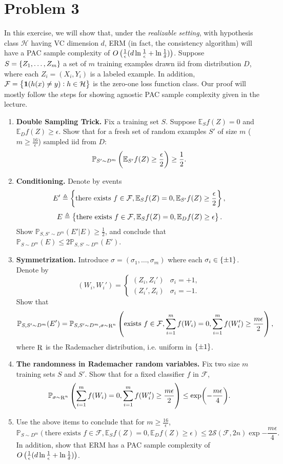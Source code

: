 \documentclass{article}
\DeclareMathOperator*{\R}{{\rm R}}
\newcommand{\EE}{\mathbb{E}} %
\newcommand{\PP}{\mathbb{P}} %
\newcommand{\Hcal}{\mathcal{H}} %
\newcommand{\Fcal}{\mathcal{F}} %
\newcommand{\Scal}{\mathcal{S}} %
\newcommand{\defeq}{\triangleq}
\newcommand*{\one}{{\bf 1}}
\begin{document}
\section*{Problem 3}
In this exercise, we will show that, under the {\em realizable setting}, with hypothesis class $\Hcal$ having VC dimension $d$, ERM (in fact, the consistency algorithm) will have a PAC sample complexity of $O\del{\frac1\epsilon(d \ln\frac1\epsilon + \ln\frac1\delta)}$. Suppose $S = \cbr{Z_1,\ldots,Z_m}$ a set of $m$ training examples drawn iid from distribution $D$,
where each $Z_i = (X_i, Y_i)$ is a labeled example. In addition, $\Fcal = \cbr{\one(h(x) \neq y): h \in \Hcal}$ is the zero-one loss function class. Our proof will mostly follow the steps for showing agnostic PAC sample complexity given in the lecture.

\begin{enumerate}
\item \textbf{Double Sampling Trick.} Fix a training set $S$. Suppose $\EE_S f(Z) = 0$ and $\EE_D f(Z) \geq \epsilon$. Show that for a fresh set of random examples $S'$ of size $m$ ($m \geq \frac{16}{\epsilon}$) sampled iid from $D$:
\[ \PP_{S' \sim D^m}\del{ \EE_{S'} f(Z) \geq \frac \epsilon 2} \geq \frac 1 2. \]

\item \textbf{Conditioning.} Denote by events
\[ E' \defeq \cbr{\text{there exists } f \in \Fcal, \EE_S f(Z) = 0, \EE_{S'} f(Z) \geq \frac \epsilon 2}, \]
\[ E \defeq \cbr{\text{there exists } f \in \Fcal, \EE_S f(Z) = 0, \EE_D f(Z) \geq \epsilon}. \]
Show $\PP_{S, S' \sim D^m}(E'|E) \geq \frac 12$, and conclude that $\PP_{S \sim D^m}(E) \leq 2\PP_{S, S' \sim D^m}(E')$.

\item \textbf{Symmetrization.} Introduce $\sigma = (\sigma_1,\ldots,\sigma_m)$ where each $\sigma_i \in \cbr{\pm 1}$. Denote by
\[
  (W_i, W_i') = \begin{cases} (Z_i, Z_i') & \sigma_i = +1, \\ (Z_i', Z_i) & \sigma_i = -1. \end{cases}
\]
Show that
\[ \PP_{S, S' \sim D^m}(E') = \PP_{S, S' \sim D^m, \sigma \sim \R^n}\del{\text{exists } f \in \Fcal, \sum_{i=1}^m f(W_i) = 0, \sum_{i=1}^m f(W_i') \geq \frac{m\epsilon}{2}}, \]
where $\R$ is the Rademacher distribution, i.e. uniform in $\cbr{\pm 1}$.

\item \textbf{The randomness in Rademacher random variables.} Fix two size $m$ training sets $S$ and $S'$. Show that for a fixed classifier
$f$ in $\Fcal$,
\[ \PP_{\sigma \sim \R^n} \del{ \sum_{i=1}^m f(W_i) = 0, \sum_{i=1}^m f(W_i') \geq \frac{m\epsilon}{2} } \leq \exp(-\frac{m\epsilon}{4}).  \]

\item Use the above items to conclude that for $m \geq \frac{16}{\epsilon}$,
\[ \PP_{S \sim D^m}(\text{there exists } f \in \Fcal, \EE_S f(Z) = 0, \EE_D f(Z) \geq \epsilon) \leq 2 \Scal(\Fcal, 2n) \exp{-\frac{m\epsilon}{4}}. \]
In addition, show that ERM has a PAC sample complexity of $O\del{\frac1\epsilon(d \ln\frac1\epsilon + \ln\frac1\delta)}$.
\end{enumerate}
\end{document}
